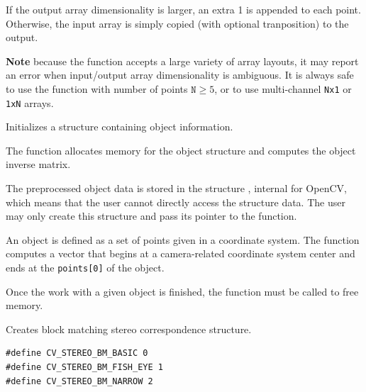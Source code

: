 If the output array dimensionality is larger, an extra 1 is appended to each point.  Otherwise, the input array is simply copied (with optional tranposition) to the output.

\textbf{Note} because the function accepts a large variety of array layouts, it may report an error when input/output array dimensionality is ambiguous. It is always safe to use the function with number of points $\texttt{N} \ge 5$, or to use multi-channel \texttt{Nx1} or \texttt{1xN} arrays.

\fi

Initializes a structure containing object information.


\begin{description}
\end{description}

The function allocates memory for the object structure and computes the object inverse matrix.

The preprocessed object data is stored in the structure , internal for OpenCV, which means that the user cannot directly access the structure data. The user may only create this structure and pass its pointer to the function.

An object is defined as a set of points given in a coordinate system. The function  computes a vector that begins at a camera-related coordinate system center and ends at the \texttt{points[0]} of the object.

Once the work with a given object is finished, the function  must be called to free memory.

Creates block matching stereo correspondence structure.

\begin{lstlisting}
#define CV_STEREO_BM_BASIC 0
#define CV_STEREO_BM_FISH_EYE 1
#define CV_STEREO_BM_NARROW 2
\end{lstlisting}


